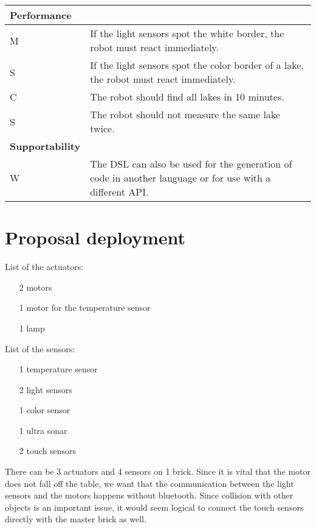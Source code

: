 \documentclass[10pt,a4paper]{article}
\begin{document}
\begin{tabular}{|p{5cm}|p{12cm}|}
\hline

  \textbf{Performance}&\\
\hline
M & If the light sensors spot the white border, the robot must react immediately.\\
S & If the light sensors spot the color border of a lake, the robot must react immediately.\\
C & The robot should find all lakes in 10 minutes. \\
S & The robot should not measure the same lake twice.\\

\hline
   \textbf{Supportability}&\\
\hline
W & The DSL can also be used for the generation of code in another language or for use with a different API.\\
\hline
\end{tabular}

\pagebreak 
\section*{Proposal deployment}
List of the actuators:
\begin{itemize}
\item[2] motors
\item[1] motor for  the temperature sensor
\item[1] lamp
\end{itemize}

\noindent List of the sensors:
\begin{itemize}
\item[1] temperature sensor
\item[2] light sensors
\item[1] color sensor
\item[1] ultra sonar
\item[2] touch sensors
\end{itemize}

There can be 3 actuators and 4 sensors on 1 brick.
Since it is vital that the motor does not fall off the table, we want that the communication between the light sensors and the motors happens without bluetooth. Since collision with other objects is an important issue, it would seem logical to connect the touch sensors directly with the master brick as well.\\ 
\end{document}
